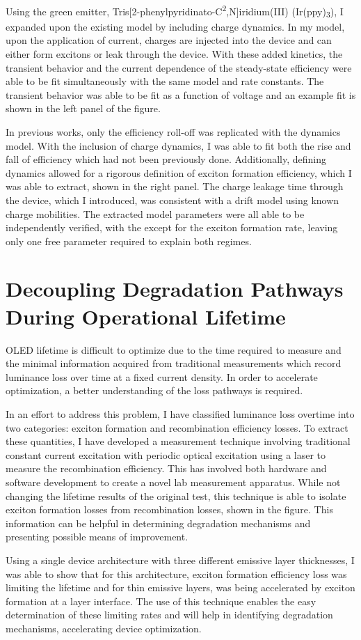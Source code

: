 \documentclass[a4paper,titlepage]{article}
\begin{document}
Using the green emitter, Tris[2-phenylpyridinato-C\textsuperscript{2},N]iridium(III) (Ir(ppy)\textsubscript{3}), I expanded upon the existing model by including charge dynamics.  In my model, upon the application of current, charges are injected into the device and can either form excitons or leak through the device.  With these added kinetics, the transient behavior and the current dependence of the steady-state efficiency were able to be fit simultaneously with the same model and rate constants.  The transient behavior was able to be fit as a function of voltage and an example fit is shown in the left panel of the figure.  

In previous works, only the efficiency roll-off was replicated with the dynamics model.  With the inclusion of charge dynamics, I was able to fit both the rise and fall of efficiency which had not been previously done.  Additionally, defining dynamics allowed for a rigorous definition of exciton formation efficiency, which I was able to extract, shown in the right panel.  The charge leakage time through the device, which I introduced, was consistent with a drift model using known charge mobilities.  The extracted model parameters were all able to be independently verified, with the except for the exciton formation rate, leaving only one free parameter required to explain both regimes.

\section*{Decoupling Degradation Pathways During Operational Lifetime}

OLED lifetime is difficult to optimize due to the time required to measure and the minimal information acquired from traditional measurements which record luminance loss over time at a fixed current density.  In order to accelerate optimization, a better understanding of the loss pathways is required.  

In an effort to address this problem, I have classified luminance loss overtime into two categories:  exciton formation and recombination efficiency losses.  To extract these quantities, I have developed a measurement technique involving traditional constant current excitation with periodic optical excitation using a laser to measure the recombination efficiency.  This has involved both hardware and software development to create a novel lab measurement apparatus.  While not changing the lifetime results of the original test, this technique is able to isolate exciton formation losses from recombination losses, shown in the figure.  This information can be helpful in determining degradation mechanisms and presenting possible means of improvement.

Using a single device architecture with three different emissive layer thicknesses, I was able to show that for this architecture, exciton formation efficiency loss was limiting the lifetime and for thin emissive layers, was being accelerated by exciton formation at a layer interface.  The use of this technique enables the easy determination of these limiting rates and will help in identifying degradation mechanisms, accelerating device optimization.
\end{document}
